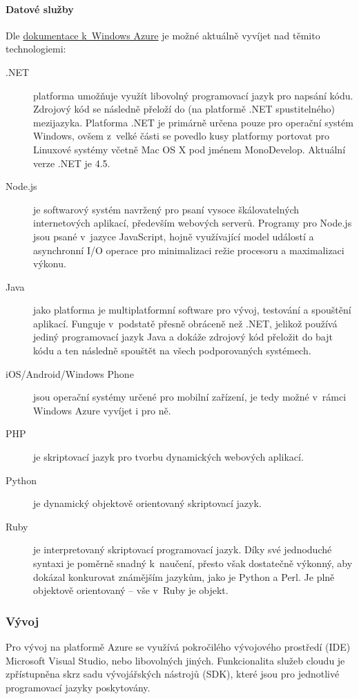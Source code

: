 \paragraph{Datové služby}
Dle \href{http://www.windowsazure.com/en-us/documentation/}{dokumentace k~Windows Azure}\cite{azure:dokumentace} je možné aktuálně vyvíjet nad těmito technologiemi:
\begin{description}
	\item [.NET] platforma umožňuje využít libovolný programovací jazyk pro napsání kódu. Zdrojový kód se následně přeloží do (na platformě .NET spustitelného) mezijazyka. Platforma .NET je primárně určena pouze pro operační systém Windows, ovšem z~velké části se povedlo kusy platformy portovat pro Linuxové systémy včetně Mac OS X pod jménem MonoDevelop. Aktuální verze .NET je 4.5.
	\item [Node.js] je softwarový systém navržený pro psaní vysoce škálovatelných internetových aplikací, především webových serverů. Programy pro Node.js jsou psané v~jazyce JavaScript, hojně využívající model událostí a asynchronní I/O operace pro minimalizaci režie procesoru a maximalizaci výkonu.\cite{wiki:node.js}
	\item [Java] jako platforma je multiplatformní software pro vývoj, testování a spouštění aplikací. Funguje v~podstatě přesně obráceně než .NET, jelikož používá jediný programovací jazyk Java a dokáže zdrojový kód přeložit do bajt kódu a ten následně spouštět na všech podporovaných systémech.
	\item [iOS/Android/Windows Phone] jsou operační systémy určené pro mobilní zařízení, je tedy možné v~rámci Windows Azure vyvíjet i pro ně.
	\item [PHP] je skriptovací jazyk pro tvorbu dynamických webových aplikací.
	\item [Python] je dynamický objektově orientovaný skriptovací jazyk.
	\item [Ruby] je interpretovaný skriptovací programovací jazyk. Díky své jednoduché syntaxi je poměrně snadný k~naučení, přesto však dostatečně výkonný, aby dokázal konkurovat známějším jazykům, jako je Python a Perl. Je plně objektově orientovaný – vše v~Ruby je objekt.\cite{wiki:ruby}
\end{description}

\subsubsection{Vývoj}
Pro vývoj na platformě Azure se využívá pokročilého vývojového prostředí (IDE) Microsoft Visual Studio, nebo libovolných jiných. Funkcionalita služeb cloudu je zpřístupněna skrz sadu vývojářských nástrojů (SDK), které jsou pro jednotlivé programovací jazyky poskytovány. 

